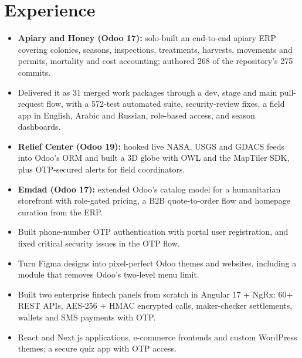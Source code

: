 \documentclass[10pt,a4paper]{article}
\begin{document}
\section*{Experience}
\begin{itemize}
  \item \textbf{Apiary and Honey (Odoo 17):} solo-built an end-to-end apiary ERP covering colonies, seasons, inspections, treatments,
        harvests, movements and permits, mortality and cost accounting; authored 268 of the repository's 275 commits.
  \item Delivered it as 31 merged work packages through a dev, stage and main pull-request flow, with a 572-test automated suite,
        security-review fixes, a field app in English, Arabic and Russian, role-based access, and season dashboards.
  \item \textbf{Relief Center (Odoo 19):} hooked live NASA, USGS and GDACS feeds into Odoo's ORM and built a 3D globe with OWL and the
        MapTiler SDK, plus OTP-secured alerts for field coordinators.
  \item \textbf{Emdad (Odoo 17):} extended Odoo's catalog model for a humanitarian storefront with role-gated pricing, a B2B
        quote-to-order flow and homepage curation from the ERP.
  \item Built phone-number OTP authentication with portal user registration, and fixed critical security issues in the OTP flow.
  \item Turn Figma designs into pixel-perfect Odoo themes and websites, including a module that removes Odoo's two-level menu limit.
\end{itemize}

\begin{itemize}
  \item Built two enterprise fintech panels from scratch in Angular 17 + NgRx: 60+ REST APIs, AES-256 + HMAC encrypted calls,
        maker-checker settlements, wallets and SMS payments with OTP.
\end{itemize}

\begin{itemize}
  \item React and Next.js applications, e-commerce frontends and custom WordPress themes; a secure quiz app with OTP access.
\end{itemize}
\end{document}
